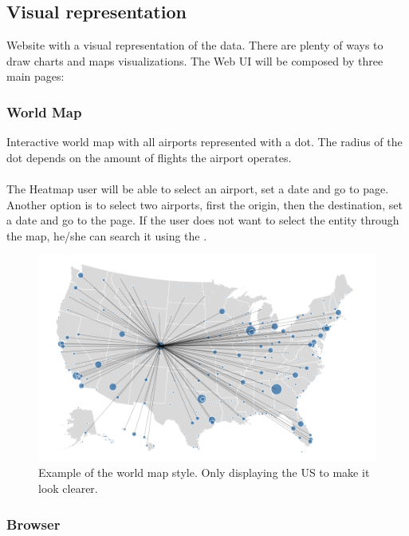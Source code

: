 \subsection{Visual representation} \label{visual_representation}

Website with a visual representation of the data. There are plenty of ways to draw charts and maps visualizations. The Web UI will be composed by three main pages:

\subsubsection*{World Map}

Interactive world map with all airports represented with a dot. The radius of the dot depends on the amount of flights the airport operates.
\\\\
The Heatmap user will be able to select an airport, set a date and go to  page. Another option is to select two airports, first the origin, then the destination, set a date and go to the  page. If the user does not want to select the entity through the map, he/she can search it using the .

\begin{figure}[H]
\centering
\includegraphics[scale=0.2]{resources/us-map-example01.png}
\caption{Example of the world map style. Only displaying the US to make it look clearer.}
\end{figure}

\subsubsection*{Browser} \label{browser}

